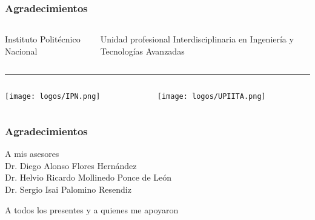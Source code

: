 
\begin{frame}[noframenumbering]
	\frametitle{Agradecimientos}
	\begin{columns}
		\begin{column}{0.5\textwidth}
			\centering Instituto Politécnico Nacional
		\end{column}
		\begin{column}{0.5\textwidth}
			\centering Unidad profesional Interdisciplinaria en Ingeniería y Tecnologías Avanzadas
		\end{column}
	\end{columns}
	\vspace*{2mm}
	\noindent\rule{\textwidth}{1pt}
	\vspace*{5mm}
	\begin{columns}
		\begin{column}{0.5\textwidth}
			\centering
			\texttt{[image: logos/IPN.png]}
		\end{column}
		\begin{column}{0.5\textwidth}
			\centering
			\texttt{[image: logos/UPIITA.png]}
		\end{column}
	\end{columns}
\end{frame}	

\begin{frame}[noframenumbering]
	\frametitle{Agradecimientos}
	\centering
	
	{\Large A mis asesores}\\
	\vspace*{5mm}
	Dr. Diego Alonso Flores Hernández\\[2mm]
	Dr. Helvio Ricardo Mollinedo Ponce de León\\[2mm]
	Dr. Sergio Isai Palomino Resendiz
	\vspace*{15mm}
	
	{\Large A todos los presentes y a quienes me apoyaron}
\end{frame}